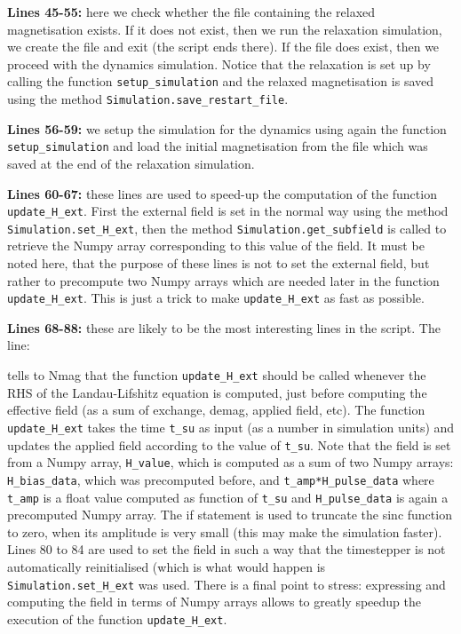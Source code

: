 \documentclass[11pt,oneside,openany]{article}
\begin{document}
\textbf{Lines 45-55:} here we check whether the file containing the relaxed
magnetisation exists. If it does not exist, then we run the relaxation
simulation, we create the file and exit (the script ends there). If the file
does exist, then we proceed with the dynamics simulation. Notice that the
relaxation is set up by calling the function \verb|setup_simulation| and the
relaxed magnetisation is saved using the method
\verb|Simulation.save_restart_file|.

\textbf{Lines 56-59:} we setup the simulation for the dynamics using again the
function \verb|setup_simulation| and load the initial magnetisation from the
file which was saved at the end of the relaxation simulation.

\textbf{Lines 60-67:} these lines are used to speed-up the computation of the
function \verb|update_H_ext|. First the external field is set in the normal way
using the method \verb|Simulation.set_H_ext|, then the method
\verb|Simulation.get_subfield| is called to retrieve the Numpy array
corresponding to this value of the field. It must be noted here, that the
purpose of these lines is not to set the external field, but rather to
precompute two Numpy arrays which are needed later in the function
\verb|update_H_ext|. This is just a trick to make \verb|update_H_ext| as fast
as possible.

\textbf{Lines 68-88:} these are likely to be the most interesting lines in the
script. The line:
%

%
tells to Nmag that the function \verb|update_H_ext| should be called whenever
the RHS of the Landau-Lifshitz equation is computed, just before computing the
effective field (as a sum of exchange, demag, applied field, etc). The function
\verb|update_H_ext| takes the time \verb|t_su| as input (as a number in
simulation units) and updates the applied field according to the value of
\verb|t_su|. Note that the field is set from a Numpy array, \verb|H_value|,
which is computed as a sum of two Numpy arrays: \verb|H_bias_data|, which was
precomputed before, and \verb|t_amp*H_pulse_data| where \verb|t_amp| is a float
value computed as function of \verb|t_su| and \verb|H_pulse_data| is again a
precomputed Numpy array.  The if statement is used to truncate the sinc
function to zero, when its amplitude is very small (this may make the
simulation faster).  Lines 80 to 84 are used to set the field in such a way
that the timestepper is not automatically reinitialised (which is what would
happen is \verb|Simulation.set_H_ext| was used.  There is a final point to
stress: expressing and computing the field in terms of Numpy arrays allows to
greatly speedup the execution of the function \verb|update_H_ext|.
\end{document}
